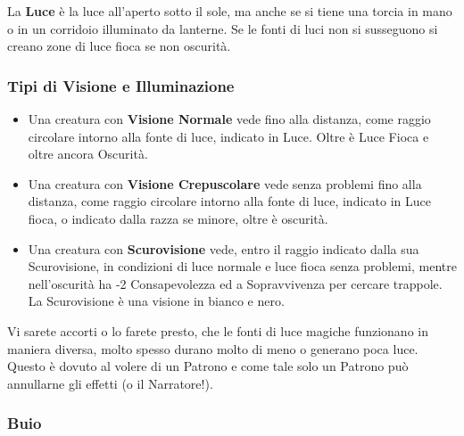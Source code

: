 \begin{multicols}{2}
\medskip

La \textbf{Luce} è la luce all'aperto sotto il sole, ma anche se si tiene una torcia in mano o in un corridoio illuminato da lanterne. Se le fonti di luci non si susseguono si creano zone di luce fioca se non oscurità.

\subsubsection{Tipi di Visione e Illuminazione}

\begin{itemize}[leftmargin=*] \setlength{\itemsep}{0pt}
\item
Una creatura con \textbf{Visione Normale} vede fino alla distanza, come raggio circolare intorno alla fonte di luce, indicato in Luce. Oltre è Luce Fioca e oltre ancora Oscurità.

\item
Una creatura con \textbf{Visione Crepuscolare} vede senza problemi fino alla distanza, come raggio circolare intorno alla fonte di luce, indicato in Luce fioca, o indicato dalla razza se minore, oltre è oscurità.

\item
Una creatura con \textbf{Scurovisione}  vede, entro il raggio indicato dalla sua Scurovisione, in condizioni di luce normale e luce fioca senza problemi, mentre nell'oscurità ha -2 Consapevolezza ed a Sopravvivenza per cercare trappole. La Scurovisione è una visione in bianco e nero.
\end{itemize}

\begin{changemargin}{0.3cm}{0.3cm}\begin{tcolorbox}[title = Nota sulle fonti di luce]
Vi sarete accorti o lo farete presto, che le fonti di luce magiche funzionano in maniera diversa, molto spesso durano molto di meno o generano poca luce. Questo è dovuto al volere di un Patrono e come tale solo un Patrono può annullarne gli effetti (o il Narratore!).
\end{tcolorbox}\end{changemargin}

\subsubsection{Buio}

\label{buio}


\end{multicols}
